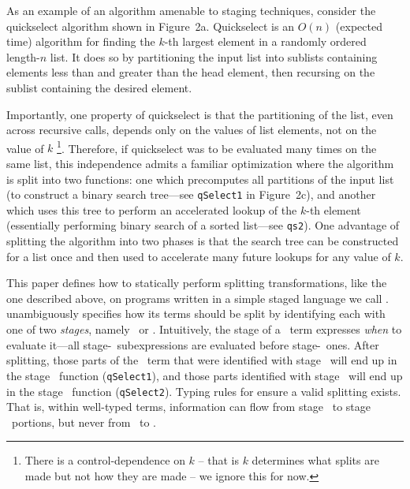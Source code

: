 As an example of an algorithm amenable to staging techniques,
consider the quickselect algorithm shown in Figure~2a.
Quickselect is an $O(n)$ (expected time) algorithm for finding the $k$-th largest element in a randomly ordered length-$n$ list.
It does so by partitioning the input list into sublists containing elements less than and greater than the head element, 
then recursing on the sublist containing the desired element.

Importantly, one property of quickselect is that the partitioning of the list, even across recursive calls, depends only on the values of list elements, not on the value of $k$ 
\footnote{There is a control-dependence on $k$ -- that is $k$ determines what splits are made but not how they are made -- we ignore this for now.}.  Therefore, if quickselect was to be evaluated many times on the same list, this independence admits a familiar optimization where the algorithm is split into two functions: one which precomputes all partitions of the input list (to construct a binary search tree---see \texttt{qSelect1} in Figure~2c),
and another which uses this tree to perform an accelerated lookup of the $k$-th element (essentially performing binary search of a sorted list---see \texttt{qs2}).
One advantage of splitting the algorithm into two phases is that the search tree can be constructed for a list once
and then used to accelerate many future lookups for any value of $k$.

This paper defines how to statically perform splitting transformations, like the one described above, on programs written in a simple staged language we call \lang.  \lang unambiguously specifies how its terms should be split
by identifying each with one of two {\em stages}, namely \bbone\ or \bbtwo.
Intuitively, the stage of a \lang\ term expresses \emph{when} to evaluate it---all stage-\bbone\
subexpressions are evaluated before stage-\bbtwo\ ones.  
After splitting, those parts of the \lang\ term that were identified with stage \bbone\ 
will end up in the stage \bbone\ function ({\tt qSelect1}), 
and those parts identified with stage \bbtwo\ will end up in the stage \bbtwo\ function ({\tt qSelect2}).
Typing rules for \lang ensure a valid splitting exists.  That is, 
within well-typed terms, information can flow from stage \bbone\ to stage \bbtwo\ portions,
but never from \bbtwo\ to \bbone.

